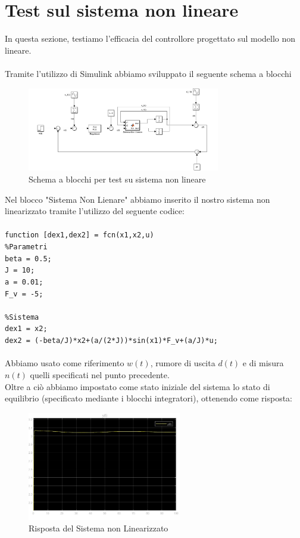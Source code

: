 \documentclass[a4paper, 11pt]{article}
\begin{document}
\section{Test sul sistema non lineare}
In questa sezione, testiamo l'efficacia del controllore progettato sul modello non lineare.
\\
\\
Tramite l'utilizzo di Simulink abbiamo sviluppato il seguente schema a blocchi
\begin{figure}[H]
    \centering
    \includegraphics[width=0.75\textwidth]{immagini/test_sistema_non_linearizzato.jpg}
    \caption{Schema a blocchi per test su sistema non lineare}
    \label{fig:simulink_sistema_non_linearizzato}
\end{figure}
Nel blocco "Sistema Non Lienare" abbiamo inserito il nostro sistema non linearizzato tramite l'utilizzo del seguente codice:\\
\\
\texttt{function [dex1,dex2] = fcn(x1,x2,u)}\\
\texttt{\%Parametri}\\
\texttt{beta = 0.5;}\\
\texttt{J = 10;}\\
\texttt{a = 0.01;}\\
\texttt{F\_v = -5;}\\
\\
\texttt{\%Sistema}\\
\texttt{dex1 = x2;}\\
\texttt{dex2 = (-beta/J)*x2+(a/(2*J))*sin(x1)*F\_v+(a/J)*u;}\\
\\
Abbiamo usato come riferimento $w(t)$, rumore di uscita $d(t)$ e di misura $n(t)$ quelli specificati nel punto precedente.\\
Oltre a ciò abbiamo impostato come stato iniziale del sistema lo 
stato di equilibrio (specificato mediante i blocchi integratori), ottenendo come risposta:
\begin{figure}[H]
    \centering
    \includegraphics[width=0.60\textwidth]{immagini/risposta_sistema_non_linearizzato.jpg}
    \caption{Risposta del Sistema non Linearizzato}
\label{fig:risposta_sistema_non:linearizzato}
\end{figure}
\end{document}
